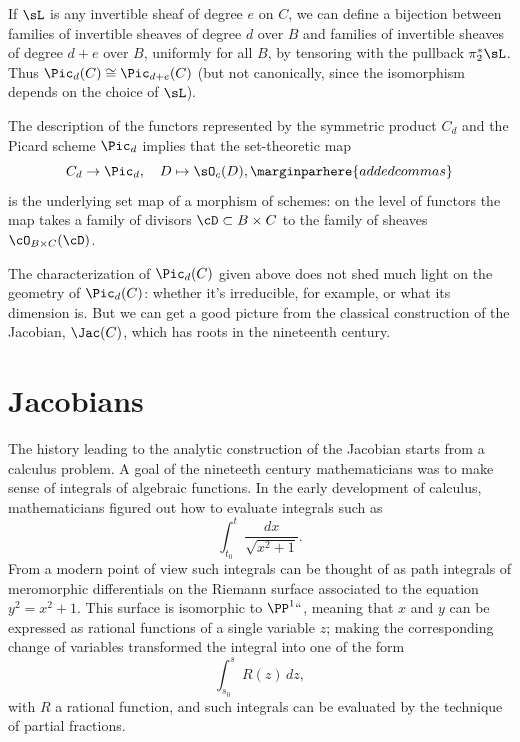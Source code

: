 If $\sL$ is any invertible sheaf of degree $e$ on $C$, we can define a
bijection between families of invertible sheaves of degree $d$ over
%
$B$ and families of invertible sheaves of degree $d+e$ over $B$,
uniformly for all $B$, by tensoring with the pullback $\pi_2^*\sL$.
Thus $\Pic_d(C) \cong \Pic_{d+e}(C)$ (but not canonically, since the
isomorphism depends on the choice of $\sL$).
 
The description of the functors represented by the symmetric product $C_d$ and the Picard scheme $\Pic_d$ implies that the 
set-theoretic map
$$
C_d \to \Pic_d, \quad D \mapsto \sO_c(D),
\marginparhere{added commas}
$$
is the underlying set map of a morphism of schemes: on the level of functors the map takes a family of divisors $\cD\subset B\times C$
to the family of sheaves $\cO_{B\times C}(\cD)$.

The characterization of $\Pic_d(C)$ 
given
above does not shed much light on the geometry of $\Pic_d(C)$: whether
it's irreducible, for example, or what its dimension is. But we can
get a  good picture from the classical construction of the Jacobian,
$\Jac(C)$, which has roots in the nineteenth century.
 
\section{Jacobians}

The history leading to the analytic construction of the Jacobian
%
starts from a 
calculus 
%
%
problem. A goal of the nineteeth century
mathematicians was  to make sense of 
integrals of algebraic functions.
%
In the early development of calculus, mathematicians figured out how
to evaluate integrals such as
$$
\int_{t_0}^t \frac{dx}{\sqrt{x^2+1}}.
$$
From a modern point of view such integrals can be thought of as 
path integrals
%
of 
meromorphic differentials
%
on the 
Riemann surface
%
associated to the equation $y^2 = x^2+1$. This surface is isomorphic
to $\PP^1` `$, meaning that $x$ and $y$ can be expressed as rational
functions of a single variable $z$; making the corresponding change of
variables transformed the integral into one of the form 
$$
\int_{s_0}^s R(z)\,dz,
$$
with $R$ a rational function, and such integrals can be evaluated by the technique of partial fractions.

